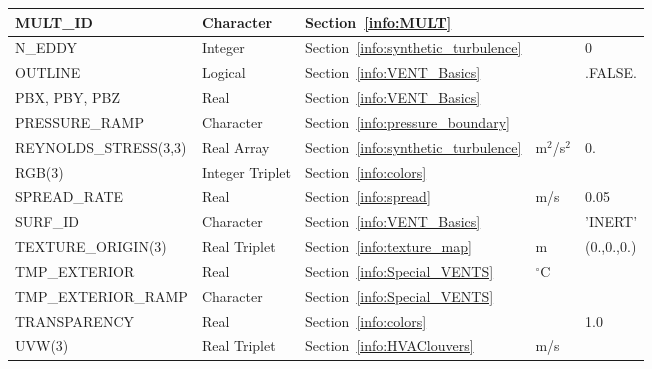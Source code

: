 \documentclass[11pt]{book}
\begin{document}
\begin{longtable}{@{\extracolsep{\fill}}|l|l|l|l|l|}
{\ct MULT\_ID    }          & Character         & Section~\ref{info:MULT}                                   &               &                     \\ \hline
{\ct N\_EDDY}               & Integer           & Section~\ref{info:synthetic_turbulence}                   &               & 0                   \\ \hline
{\ct OUTLINE}               & Logical           & Section~\ref{info:VENT_Basics}                            &               &  {\ct .FALSE.}     \\ \hline
{\ct PBX, PBY, PBZ  }       & Real              & Section~\ref{info:VENT_Basics}                            &               &                     \\ \hline
{\ct PRESSURE\_RAMP}        & Character         & Section~\ref{info:pressure_boundary}                      &               &                     \\ \hline
{\ct REYNOLDS\_STRESS(3,3)} & Real Array        & Section~\ref{info:synthetic_turbulence}                   & m$^2$/s$^2$   & 0.                  \\ \hline
{\ct RGB(3)   }             & Integer Triplet   & Section~\ref{info:colors}                                 &               &                     \\ \hline
{\ct SPREAD\_RATE}          & Real              & Section~\ref{info:spread}                                 & m/s           &  0.05               \\ \hline
{\ct SURF\_ID}              & Character         & Section~\ref{info:VENT_Basics}                            &               &  {\ct 'INERT'}      \\ \hline
{\ct TEXTURE\_ORIGIN(3)}    & Real Triplet      & Section~\ref{info:texture_map}                            & m             & (0.,0.,0.)          \\ \hline
{\ct TMP\_EXTERIOR}         & Real              & Section~\ref{info:Special_VENTS}                          & $^\circ$C     &                     \\ \hline
{\ct TMP\_EXTERIOR\_RAMP}   & Character         & Section~\ref{info:Special_VENTS}                          &               &                     \\ \hline
{\ct TRANSPARENCY}          & Real              & Section~\ref{info:colors}                                 &               &   1.0               \\ \hline
{\ct UVW(3) }               & Real Triplet      & Section~\ref{info:HVAClouvers}                            & m/s           &                     \\ \hline

\end{longtable}
\end{document}
